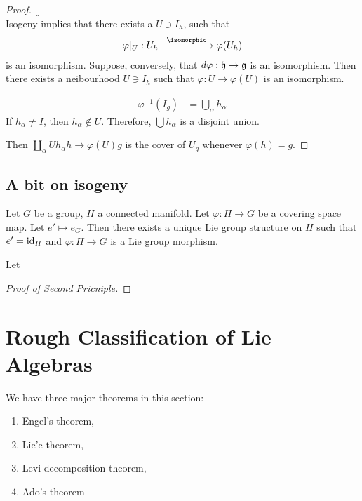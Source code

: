 \begin{proof}  {[]} \\
Isogeny implies that there exists a $U\ni I_h$, such that
\begin{align}
    \varphi|_U : U_h \xrightarrow{\ \isomorphic\ } \varphi(U_h)
\end{align}
is an isomorphism.
Suppose, conversely, that $d\varphi: \mathfrak{h}\to \mathfrak{g}$ is an isomorphism. Then there exists a neibourhood $U\ni I_h$ such that $    \varphi: U\to \varphi(U)$ is an isomorphism.

\begin{align}
    \varphi^{-1} (I_g) &= \bigcup_\alpha h_\alpha 
\end{align}
If $h_\alpha \neq I$, then $h_\alpha \not\in U$. Therefore, $\bigcup h_\alpha$ is a disjoint union.


Then $\coprod_\alpha U h_\alpha h\to \varphi(U)g$  is the cover of $U_g$ whenever $\varphi(h)=g$.

\end{proof}

\subsection{A bit on isogeny}
\label{sub:a_bit_on_isogeny}

Let $G$ be a group, $H$ a connected manifold. Let $\varphi: H\to G$ be a covering space map. Let $e' \mapsto e_G$. Then there exists a unique Lie group structure on $H$ such that  $e' = \operatorname{id}_H$ and $\varphi: H\to G$ is a Lie group morphism.

\begin{proposition}
   Let   
\end{proposition}

\begin{proof}[Proof of Second Pricniple]
\end{proof}

\section{Rough Classification of Lie Algebras}
\label{sec:rough_classification_of_lie_algebras}

We have three major theorems in this section:
\begin{enumerate}
    \makethislistcompact
    \item Engel's theorem,
    \item Lie'e theorem,
    \item Levi decomposition theorem,
    \item Ado's theorem
\end{enumerate}

